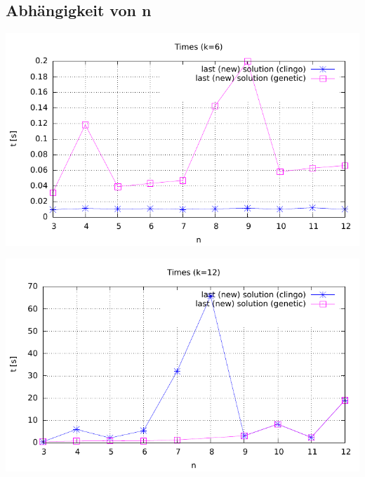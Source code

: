 \subsection{Abhängigkeit von n}


\includegraphics{../../plots/timesPerN-k6.pdf}

\includegraphics{../../plots/timesPerN-k12.pdf}

